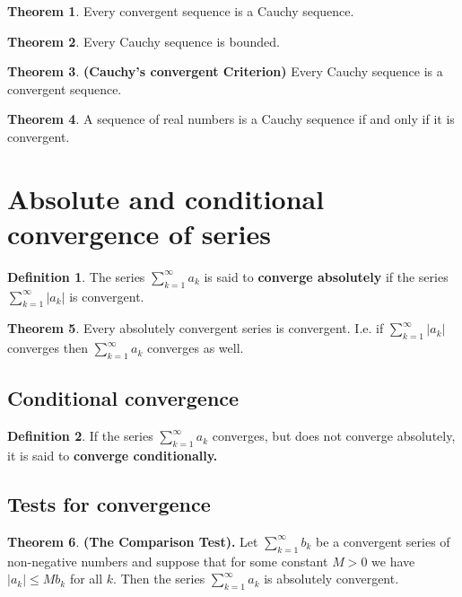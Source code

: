 \documentclass[12pt, a4paper]{article}
\theoremstyle{definition}
\newtheorem{definition}{Definition}[section]
\newtheorem{theorem}{Theorem}[section]
\theoremstyle{plain}
\begin{document}
\begin{theorem}
Every convergent sequence is a Cauchy sequence.
\end{theorem}

\begin{theorem}
Every Cauchy sequence is bounded.
\end{theorem}

\begin{theorem}\textbf{(Cauchy's convergent Criterion)}
Every Cauchy sequence is a convergent sequence.
\end{theorem}

\begin{theorem}
A sequence of real numbers is a Cauchy sequence if and only if it is convergent.
\end{theorem}

\section{Absolute and conditional convergence of series}

\begin{definition}
The series $\sum_{k=1}^{\infty} a_k$ is said to \textbf{converge absolutely} if the series $\sum_{k=1}^{\infty} |a_k|$ is convergent.
\end{definition}

\begin{theorem}
Every absolutely convergent series is convergent. 
I.e. if $\sum_{k=1}^{\infty} |a_k|$ converges then $\sum_{k=1}^{\infty} a_k$ converges as well.
\end{theorem}

\subsection{Conditional convergence}

\begin{definition}
If the series $\sum_{k=1}^{\infty} a_k$ converges, but does not converge absolutely, it is said to \textbf{converge conditionally.}
\end{definition}

\subsection{Tests for convergence}

\begin{theorem} \textbf{(The Comparison Test).}
Let $\sum_{k=1}^{\infty} b_k$ be a convergent series of non-negative numbers and suppose that for some constant $M > 0$ we have $|a_k| \leq Mb_k$ for all $k.$ Then the series $\sum_{k=1}^{\infty} a_k$ is absolutely convergent.
\end{theorem}
\end{document}
